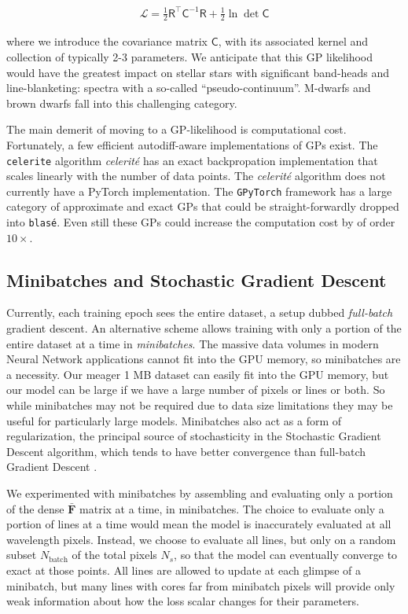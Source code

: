 \documentclass[twocolumn]{aastex631}
\begin{document}
\begin{eqnarray}
    \mathcal{L} =  \frac{1}{2}\mathsf{R^\intercal} \mathsf{C}^{-1} \mathsf{R} +\frac{1}{2}\ln{\det{\mathsf{C}}} \label{GPLikelihood}
\end{eqnarray}

where we introduce the covariance matrix $\mathsf{C}$, with its associated kernel and collection of typically 2-3 parameters.  We anticipate that this GP likelihood would have the greatest impact on stellar stars with significant band-heads and line-blanketing: spectra with a so-called ``pseudo-continuum''.  M-dwarfs and brown dwarfs fall into this challenging category.

The main demerit of moving to a GP-likelihood is computational cost.  Fortunately, a few efficient autodiff-aware implementations of GPs exist. The \texttt{celerite} algorithm \emph{celerit\'e} \citep{2017AJ....154..220F} has an exact backpropation implementation \citep{2018RNAAS...2...31F} that scales linearly with the number of data points.  The \emph{celerit\'e} algorithm does not currently have a PyTorch implementation.  The \texttt{GPyTorch} framework \citep{2018arXiv180911165G} has a large category of approximate and exact GPs that could be straight-forwardly dropped into \texttt{blas\'e}.  Even still these GPs could increase the computation cost by of order $10\times$.


\subsection{Minibatches and Stochastic Gradient Descent}

Currently, each training epoch sees the entire dataset, a setup dubbed \emph{full-batch} gradient descent.
An alternative scheme allows training with only a portion of the entire dataset at a time in \emph{minibatches}.  The massive data volumes in modern Neural Network applications cannot fit into the GPU memory, so minibatches are a necessity.  Our meager 1 MB dataset can easily fit into the GPU memory, but our model can be large if we have a large number of pixels or lines or both.
So while minibatches may not be required due to data size limitations they may be useful for particularly large models.
Minibatches also act as a form of regularization, the principal source of stochasticity in the Stochastic Gradient Descent algorithm, which tends to have better convergence than full-batch Gradient Descent \citep{2016arXiv160904747R}.

We experimented with minibatches by assembling and evaluating only a portion of the dense $\bar{\bm{F}}$ matrix at a time, in minibatches. The choice to evaluate only a portion of lines at a time would mean the model is inaccurately evaluated at all wavelength pixels. Instead, we choose to evaluate all lines, but only on a random subset $N_{\mathrm{batch}}$ of the total pixels $N_s$, so that the model can eventually converge to exact at those points. All lines are allowed to update at each glimpse of a minibatch, but many lines with cores far from minibatch pixels will provide only weak information about how the loss scalar changes for their parameters.
\end{document}
